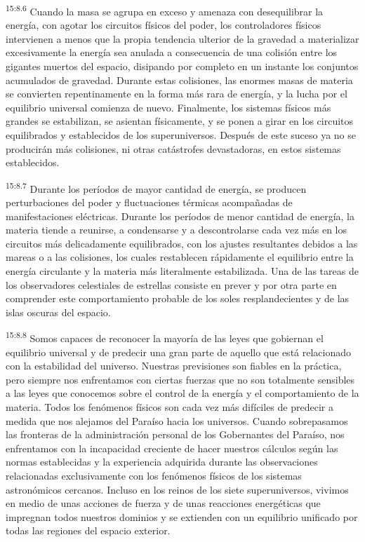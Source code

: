 \par
\textsuperscript{15:8.6} Cuando la masa se agrupa en exceso y amenaza con desequilibrar la energía, con agotar los circuitos físicos del poder, los controladores físicos intervienen a menos que la propia tendencia ulterior de la gravedad a materializar excesivamente la energía sea anulada a consecuencia de una colisión entre los gigantes muertos del espacio, disipando por completo en un instante los conjuntos acumulados de gravedad. Durante estas colisiones, las enormes masas de materia se convierten repentinamente en la forma más rara de energía, y la lucha por el equilibrio universal comienza de nuevo. Finalmente, los sistemas físicos más grandes se estabilizan, se asientan físicamente, y se ponen a girar en los circuitos equilibrados y establecidos de los superuniversos. Después de este suceso ya no se producirán más colisiones, ni otras catástrofes devastadoras, en estos sistemas establecidos.

\par
\textsuperscript{15:8.7} Durante los períodos de mayor cantidad de energía, se producen perturbaciones del poder y fluctuaciones térmicas acompañadas de manifestaciones eléctricas. Durante los períodos de menor cantidad de energía, la materia tiende a reunirse, a condensarse y a descontrolarse cada vez más en los circuitos más delicadamente equilibrados, con los ajustes resultantes debidos a las mareas o a las colisiones, los cuales restablecen rápidamente el equilibrio entre la energía circulante y la materia más literalmente estabilizada. Una de las tareas de los observadores celestiales de estrellas consiste en prever y por otra parte en comprender este comportamiento probable de los soles resplandecientes y de las islas oscuras del espacio.

\par
\textsuperscript{15:8.8} Somos capaces de reconocer la mayoría de las leyes que gobiernan el equilibrio universal y de predecir una gran parte de aquello que está relacionado con la estabilidad del universo. Nuestras previsiones son fiables en la práctica, pero siempre nos enfrentamos con ciertas fuerzas que no son totalmente sensibles a las leyes que conocemos sobre el control de la energía y el comportamiento de la materia. Todos los fenómenos físicos son cada vez más difíciles de predecir a medida que nos alejamos del Paraíso hacia los universos. Cuando sobrepasamos las fronteras de la administración personal de los Gobernantes del Paraíso, nos enfrentamos con la incapacidad creciente de hacer nuestros cálculos según las normas establecidas y la experiencia adquirida durante las observaciones relacionadas exclusivamente con los fenómenos físicos de los sistemas astronómicos cercanos. Incluso en los reinos de los siete superuniversos, vivimos en medio de unas acciones de fuerza y de unas reacciones energéticas que impregnan todos nuestros dominios y se extienden con un equilibrio unificado por todas las regiones del espacio exterior.

